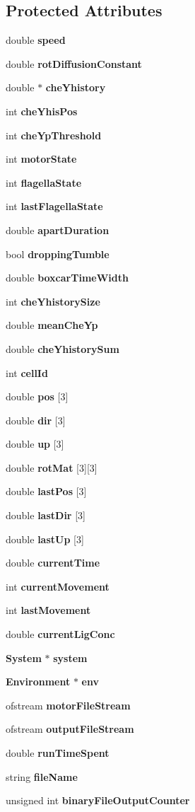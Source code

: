 \subsection*{Protected Attributes}
\begin{CompactItemize}
\item 
double {\bf speed}
\item 
double {\bf rotDiffusionConstant}
\item 
double $\ast$ {\bf cheYhistory}
\item 
int {\bf cheYhisPos}
\item 
int {\bf cheYpThreshold}
\item 
int {\bf motorState}
\item 
int {\bf flagellaState}
\item 
int {\bf lastFlagellaState}
\item 
double {\bf apartDuration}
\item 
bool {\bf droppingTumble}
\item 
double {\bf boxcarTimeWidth}
\item 
int {\bf cheYhistorySize}
\item 
double {\bf meanCheYp}
\item 
double {\bf cheYhistorySum}
\item 
int {\bf cellId}
\item 
double {\bf pos} [3]
\item 
double {\bf dir} [3]
\item 
double {\bf up} [3]
\item 
double {\bf rotMat} [3][3]
\item 
double {\bf lastPos} [3]
\item 
double {\bf lastDir} [3]
\item 
double {\bf lastUp} [3]
\item 
double {\bf currentTime}
\item 
int {\bf currentMovement}
\item 
int {\bf lastMovement}
\item 
double {\bf currentLigConc}
\item 
{\bf System} $\ast$ {\bf system}
\item 
{\bf Environment} $\ast$ {\bf env}
\item 
ofstream {\bf motorFileStream}
\item 
ofstream {\bf outputFileStream}
\item 
double {\bf runTimeSpent}
\item 
string {\bf fileName}
\item 
unsigned int {\bf binaryFileOutputCounter}
\end{CompactItemize}
